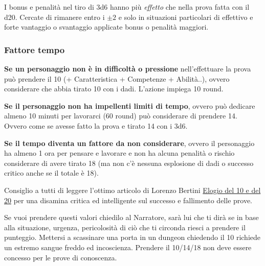 \begin{multicols}{2}
\begin{changemargin}{0.3cm}{0.3cm}\begin{narratore}
I bonus e penalità nel tiro di 3d6 hanno più \emph{effetto} che nella prova fatta con il d20. Cercate di rimanere entro i $\pm2$ e solo in situazioni particolari di effettivo e forte vantaggio o svantaggio applicate bonus o penalità maggiori.
\end{narratore}\end{changemargin}

\subsubsection{Fattore tempo}\label{fattoretempo}

\textbf{Se un personaggio non è in difficoltà o pressione} nell'effettuare la prova può prendere il 10 (+ Caratteristica + Competenze + Abilità..), ovvero considerare che abbia tirato 10 con i dadi. L'azione impiega 10 round. \label{prendere10}

\textbf{Se il personaggio non ha impellenti limiti di tempo}, ovvero può dedicare almeno 10 minuti per lavorarci (60 round) può considerare di prendere 14. Ovvero come se avesse fatto la prova e tirato 14 con i 3d6. \label{prendere14}

\textbf{Se il tempo diventa un fattore da non considerare}, ovvero il personaggio ha almeno 1 ora per pensare e lavorare e non ha alcuna penalità o rischio considerare di avere tirato 18 (ma non c'è nessuna esplosione di dadi o successo critico anche se il totale è 18).\label{prendere18}

\begin{changemargin}{0.3cm}{0.3cm}\begin{narratore}
Consiglio a tutti di leggere l'ottimo articolo di Lorenzo Bertini \href{https://dietroschermo.wordpress.com/2022/03/10/elogio-del-10-e-del-20}{Elogio del 10 e del 20} per una disamina critica ed intelligente sul successo e fallimento delle prove.
\end{narratore}\end{changemargin}

Se vuoi prendere questi valori chiedilo al Narratore, sarà lui che ti dirà se in base alla situazione, urgenza, pericolosità di ciò che ti circonda riesci a prendere il punteggio. Mettersi a scassinare una porta in un dungeon chiedendo il 10 richiede un estremo sangue freddo ed incoscienza. Prendere il 10/14/18 non deve essere concesso per le prove di conoscenza.


\end{multicols}
